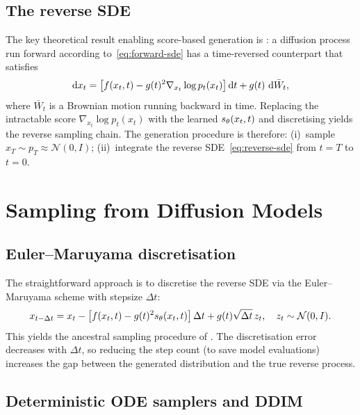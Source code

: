 \subsection{The reverse SDE}
\label{ssec:reverse-sde}

The key theoretical result enabling score-based generation is
\textcite{anderson1982reverse}: a diffusion process run forward according
to~\eqref{eq:forward-sde} has a time-reversed counterpart that satisfies
\begin{equation}
  \mathop{}\!\mathrm{d} x_t = \left[f(x_t, t) - g(t)^2 \nabla_{x_t} \log p_t(x_t)\right]\mathop{}\!\mathrm{d} t
             + g(t)\,\mathop{}\!\mathrm{d} \bar{W}_t,
  \label{eq:reverse-sde}
\end{equation}
where $\bar{W}_t$ is a Brownian motion running backward in time. Replacing the
intractable score $\nabla_{x_t} \log p_t(x_t)$ with the learned $s_\theta(x_t, t)$ and
discretising yields the reverse sampling chain. The generation procedure is therefore:
(i)~sample $x_T \sim p_T \approx \mathcal{N}(0, I)$; (ii)~integrate the reverse
SDE~\eqref{eq:reverse-sde} from $t = T$ to $t = 0$.

\section{Sampling from Diffusion Models}
\label{sec:diffusion-sampling}

\subsection{Euler--Maruyama discretisation}
\label{ssec:euler-maruyama}

The straightforward approach is to discretise the reverse SDE via the Euler--Maruyama
scheme with stepsize $\Delta t$:
\begin{equation}
  x_{t - \Delta t} = x_t
    - \left[f(x_t, t) - g(t)^2 s_\theta(x_t, t)\right]\Delta t
    + g(t)\sqrt{\Delta t}\,z_t,
  \quad z_t \sim \mathcal{N}(0,I).
  \label{eq:euler-maruyama}
\end{equation}
This yields the ancestral sampling procedure of \textcite{ho2020ddpm}. The discretisation
error decreases with $\Delta t$, so reducing the step count (to save model evaluations)
increases the gap between the generated distribution and the true reverse process.

\subsection{Deterministic ODE samplers and DDIM}
\label{ssec:ddim}


